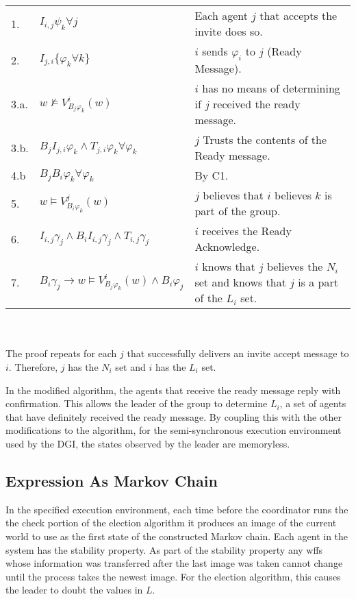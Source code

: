 \begin{table}[h!]
\centering
\small
\begin{tabularx}{\linewidth}{l X X}
1. & $I_{i,j} \psi_k \forall j $ & Each agent $j$ that accepts the invite does so.  \\
2. & $I_{j,i} \{ \varphi_k \forall k \}$ & $i$ sends $\varphi_i$ to $j$ (Ready Message). \\
3.a. & $w \not \vDash V_{B_j \varphi_k}^i(w) $ & $i$ has no means of determining if $j$ received the ready message. \\
3.b. & $B_{j}I_{j,i} \varphi_k \wedge T_{j,i} \varphi_k \forall \varphi_k$ & $j$ Trusts the contents of the Ready message. \\
4.b & $B_j B_i \varphi_k \forall \varphi_k$ & By C1. \\
5. & $w \vDash V_{B_i \varphi_k}^j(w)$ & $j$ believes that $i$ believes $k$ is part of the group. \\
6. & $I_{i,j} \gamma_j \wedge B_i I_{i,j} \gamma_j \wedge T_{i,j} \gamma_j$ & $i$ receives the Ready Acknowledge. \\
7. & $B_i \gamma_j \rightarrow w \vDash V_{B_j \varphi_k}^{i}(w) \wedge B_i \varphi_j$ & $i$ knows that $j$ believes the $N_i$ set and knows that $j$ is a part of the $L_i$ set. \\
\end{tabularx} \\~\\
The proof repeats for each $j$ that successfully delivers an invite accept message to $i$. Therefore, $j$ has the $N_i$ set and $i$ has the $L_i$ set.
\label{tab:annonymityproof}
\end{table}

In the modified algorithm, the agents that receive the ready message reply with confirmation. This allows the leader of the group to determine $L_i$, a set of agents that have definitely received the ready message. By coupling this with the other modifications to the algorithm, for the semi-synchronous execution environment used by the \ac{DGI}, the states observed by the leader are memoryless.

\subsection{Expression As Markov Chain}

In the specified execution environment, each time before the coordinator runs the the check portion of the election algorithm it produces an image of the current world to use as the first state of the constructed Markov chain. Each agent in the system has the stability property. As part of the stability property any wffs whose information was transferred after the last image was taken cannot change until the process takes the newest image. For the election algorithm, this causes the leader to doubt the values in $L$.

